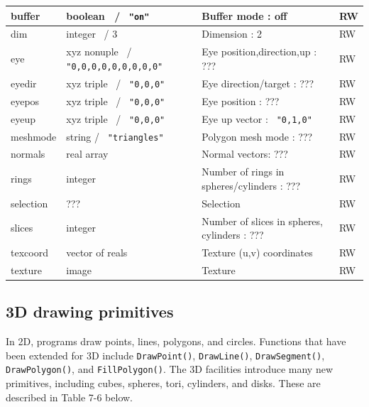 \begin{center}
\begin{supertabular}{|m{1.076in}|m{1.5in}|m{2.58in}|m{0.448in}|}
buffer &
boolean \ / \texttt{ "on" } &
Buffer mode : off &
RW\\\hline
dim &
integer \ / 3 &
Dimension : 2 &
RW\\\hline
eye &
xyz nonuple \ / \texttt{ "0,0,0,0,0,0,0,0,0"} &
Eye position,direction,up : ??? &
RW\\\hline
eyedir &
xyz triple \ / \texttt{ "0,0,0"} &
Eye direction/target : ??? &
RW\\\hline
eyepos &
xyz triple \ / \texttt{ "0,0,0" } &
Eye position : ??? &
RW\\\hline
eyeup &
xyz triple \ / \texttt{ "0,0,0" } &
Eye up vector : \texttt{ "0,1,0" } &
RW\\\hline
meshmode &
string / \texttt{ "triangles"} &
Polygon mesh mode : ??? &
RW\\\hline
normals &
real array  &
Normal vectors: ??? &
RW\\\hline
rings &
integer &
Number of rings in spheres/cylinders : ??? &
RW\\\hline
selection &
??? &
Selection &
RW\\\hline
slices &
integer &
Number of slices in spheres, cylinders : ???  &
RW\\\hline
texcoord &
vector of reals &
Texture (u,v) coordinates &
RW\\\hline
texture &
image &
Texture &
RW\\\hline
\end{supertabular}
\end{center}


\subsection{3D drawing primitives}

In 2D, programs draw points, lines, polygons, and circles. Functions
that have been extended for 3D include \texttt{DrawPoint()},
\texttt{DrawLine()}, \texttt{DrawSegment()}, \texttt{DrawPolygon()},
and \texttt{FillPolygon()}. The 3D facilities introduce many new
primitives, including cubes, spheres, tori, cylinders, and
disks. These are described in Table 7-6 below.

